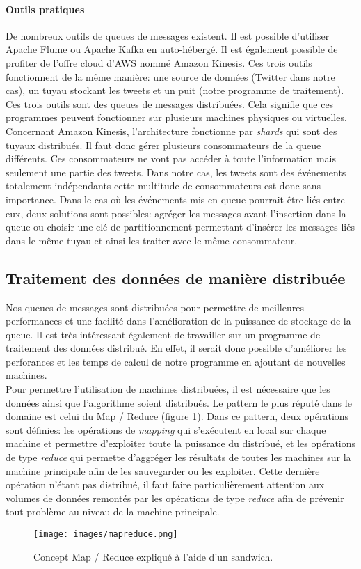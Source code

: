   \paragraph{Outils pratiques}
  \label{par:Outils pratiques}
  De nombreux outils de queues de messages existent. Il est possible d'utiliser Apache Flume ou Apache Kafka en auto-hébergé. Il est également possible de profiter de l'offre cloud d'AWS nommé Amazon Kinesis. Ces trois outils fonctionnent de la même manière: une source de données (Twitter dans notre cas), un tuyau stockant les tweets et un puit (notre programme de traitement).\\

  Ces trois outils sont des queues de messages distribuées. Cela signifie que ces programmes peuvent fonctionner sur plusieurs machines physiques ou virtuelles. Concernant Amazon Kinesis, l'architecture fonctionne par \textit{shards} qui sont des tuyaux distribués. Il faut donc gérer plusieurs consommateurs de la queue différents. Ces consommateurs ne vont pas accéder à toute l'information mais seulement une partie des tweets. Dans notre cas, les tweets sont des événements totalement indépendants cette multitude de consommateurs est donc sans importance. Dans le cas où les événements mis en queue pourrait être liés entre eux, deux solutions sont possibles: agréger les messages avant l'insertion dans la queue ou choisir une clé de partitionnement permettant d'insérer les messages liés dans le même tuyau et ainsi les traiter avec le même consommateur.

\subsection{Traitement des données de manière distribuée}
\label{sub:Traitement des données de manière distribuée}

  Nos queues de messages sont distribuées pour permettre de meilleures performances et une facilité dans l'amélioration de la puissance de stockage de la queue. Il est très intéressant également de travailler sur un programme de traitement des données distribué. En effet, il serait donc possible d'améliorer les perforances et les temps de calcul de notre programme en ajoutant de nouvelles machines.\\

  Pour permettre l'utilisation de machines distribuées, il est nécessaire que les données ainsi que l'algorithme soient distribués. Le pattern le plus réputé dans le domaine est celui du Map / Reduce (figure \ref{mapreduce}). Dans ce pattern, deux opérations sont définies: les opérations de \textit{mapping} qui s'exécutent en local sur chaque machine et permettre d'exploiter toute la puissance du distribué, et les opérations de type \textit{reduce} qui permette d'aggréger les résultats de toutes les machines sur la machine principale afin de les sauvegarder ou les exploiter. Cette dernière opération n'étant pas distribué, il faut faire particulièrement attention aux volumes de données remontés par les opérations de type \textit{reduce} afin de prévenir tout problème au niveau de la machine principale.

  \begin{figure}
    \centering
    \texttt{[image: images/mapreduce.png]}
    \caption{Concept Map / Reduce expliqué à l'aide d'un sandwich.}
    \label{mapreduce}
  \end{figure}

